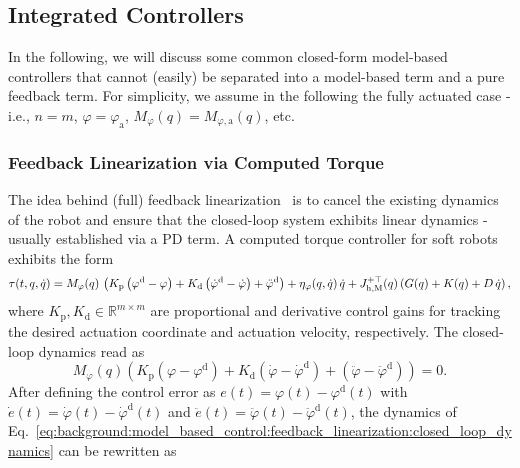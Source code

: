 \subsection{Integrated Controllers}\label{sub:background:model_based_control:integrated_controllers}
In the following, we will discuss some common closed-form model-based controllers that cannot (easily) be separated into a model-based term and a pure feedback term.
For simplicity, we assume in the following the fully actuated case - i.e., $n=m$, $\varphi = \varphi_\mathrm{a}$, $M_{\varphi}(q) = M_{\varphi,\mathrm{a}}(q)$, etc.

\subsubsection{Feedback Linearization via Computed Torque}
The idea behind (full) feedback linearization~\citep{slotine1987on, spong2020robot} is to 
cancel the existing dynamics of the robot and ensure that the closed-loop system exhibits linear dynamics - usually established via a PD term. A computed torque controller for soft robots exhibits the form
\begin{equation}\small
    \tau(t,q,\dot{q}) = M_{\varphi}(q) \, \left (K_\mathrm{p} \left (\varphi^\mathrm{d} - \varphi \right ) + K_\mathrm{d} \left (\dot{\varphi}^\mathrm{d} - \dot{\varphi} \right ) + \ddot{\varphi}^\mathrm{d}\right ) + \eta_{\varphi}(q,\dot{q}) \, \dot{q} + J_{\mathrm{h},\mathrm{M}}^{+\top}(q) \left ( G(q) + K(q) + D \, \dot{q} \right ),
\end{equation}
where $K_\mathrm{p}, K_\mathrm{d} \in \mathbb{R}^{m \times m}$ are proportional and derivative control gains for tracking the desired actuation coordinate and actuation velocity, respectively. 
The closed-loop dynamics read as
\begin{equation}\label{eq:background:model_based_control:feedback_linearization:closed_loop_dynamics}
    M_{\varphi}(q) \left (K_\mathrm{p} \left (\varphi - \varphi^\mathrm{d} \right ) + K_\mathrm{d} \left (\dot{\varphi} - \dot{\varphi}^\mathrm{d} \right ) + \left ( \ddot{\varphi} - \ddot{\varphi}^\mathrm{d} \right ) \right ) = 0.
\end{equation}
After defining the control error as $e(t) = \varphi(t) - \varphi^\mathrm{d}(t)$ with $\dot{e}(t) = \dot{\varphi}(t) - \dot{\varphi}^\mathrm{d}(t)$ and $\ddot{e}(t) = \ddot{\varphi}(t) - \ddot{\varphi}^\mathrm{d}(t)$, the dynamics of Eq.~\ref{eq:background:model_based_control:feedback_linearization:closed_loop_dynamics} can be rewritten as
